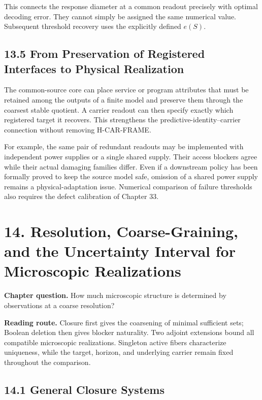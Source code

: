 \documentclass[
  english,
  11pt,
  oneside]{book}
\begin{document}
This connects the response diameter at a common readout precisely with optimal decoding error. They cannot simply be assigned the same numerical value. Subsequent threshold recovery uses the explicitly defined \(e(S)\).

\section{13.5 From Preservation of Registered Interfaces to Physical Realization}\label{from-preservation-of-registered-interfaces-to-physical-realization}

The common-source core can place service or program attributes that must be retained among the outputs of a finite model and preserve them through the coarsest stable quotient. A carrier readout can then specify exactly which registered target it recovers. This strengthens the predictive-identity--carrier connection without removing H-CAR-FRAME.

For example, the same pair of redundant readouts may be implemented with independent power supplies or a single shared supply. Their access blockers agree while their actual damaging families differ. Even if a downstream policy has been formally proved to keep the source model safe, omission of a shared power supply remains a physical-adaptation issue. Numerical comparison of failure thresholds also requires the defect calibration of Chapter 33.

\chapter{14. Resolution, Coarse-Graining, and the Uncertainty Interval for Microscopic Realizations}\label{ch-14}

\textbf{Chapter question.} How much microscopic structure is determined by observations at a coarse resolution?

\textbf{Reading route.} Closure first gives the coarsening of minimal sufficient sets; Boolean deletion then gives blocker naturality. Two adjoint extensions bound all compatible microscopic realizations. Singleton active fibers characterize uniqueness, while the target, horizon, and underlying carrier remain fixed throughout the comparison.

\section{14.1 General Closure Systems}\label{general-closure-systems}
\end{document}
